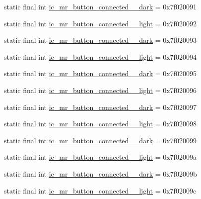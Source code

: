 \begin{CompactItemize}
static final int \hyperlink{classandroid_1_1support_1_1v7_1_1mediarouter_1_1_r_1_1drawable_a4b7ceed055ed8a8a606d55082029c1d}{ic\_\-mr\_\-button\_\-connected\_\_\-dark} = 0x7f020091
\item 
static final int \hyperlink{classandroid_1_1support_1_1v7_1_1mediarouter_1_1_r_1_1drawable_e6fe39132d78265ba9bde059a2617a70}{ic\_\-mr\_\-button\_\-connected\_\_\-light} = 0x7f020092
\item 
static final int \hyperlink{classandroid_1_1support_1_1v7_1_1mediarouter_1_1_r_1_1drawable_1183c77114c34077fe4e54994c1e7ea2}{ic\_\-mr\_\-button\_\-connected\_\_\-dark} = 0x7f020093
\item 
static final int \hyperlink{classandroid_1_1support_1_1v7_1_1mediarouter_1_1_r_1_1drawable_848f3fd8d2eba79fd1729a7da03676ee}{ic\_\-mr\_\-button\_\-connected\_\_\-light} = 0x7f020094
\item 
static final int \hyperlink{classandroid_1_1support_1_1v7_1_1mediarouter_1_1_r_1_1drawable_a94cb3138c5e424335cd6d3b458a693c}{ic\_\-mr\_\-button\_\-connected\_\_\-dark} = 0x7f020095
\item 
static final int \hyperlink{classandroid_1_1support_1_1v7_1_1mediarouter_1_1_r_1_1drawable_faa627654ae3a94f848380115d5cb4b5}{ic\_\-mr\_\-button\_\-connected\_\_\-light} = 0x7f020096
\item 
static final int \hyperlink{classandroid_1_1support_1_1v7_1_1mediarouter_1_1_r_1_1drawable_0e6b4a5eeeac52d13503385c0054c90e}{ic\_\-mr\_\-button\_\-connected\_\_\-dark} = 0x7f020097
\item 
static final int \hyperlink{classandroid_1_1support_1_1v7_1_1mediarouter_1_1_r_1_1drawable_79076d41d07c34caa45f762e806cdafb}{ic\_\-mr\_\-button\_\-connected\_\_\-light} = 0x7f020098
\item 
static final int \hyperlink{classandroid_1_1support_1_1v7_1_1mediarouter_1_1_r_1_1drawable_f205e6f4d2d6845e7c35691b739567ac}{ic\_\-mr\_\-button\_\-connected\_\_\-dark} = 0x7f020099
\item 
static final int \hyperlink{classandroid_1_1support_1_1v7_1_1mediarouter_1_1_r_1_1drawable_86fd229f6803591794353fbc3a47dc45}{ic\_\-mr\_\-button\_\-connected\_\_\-light} = 0x7f02009a
\item 
static final int \hyperlink{classandroid_1_1support_1_1v7_1_1mediarouter_1_1_r_1_1drawable_edc7717ef204ea4f8324f409ff533e52}{ic\_\-mr\_\-button\_\-connected\_\_\-dark} = 0x7f02009b
\item 
static final int \hyperlink{classandroid_1_1support_1_1v7_1_1mediarouter_1_1_r_1_1drawable_0d6f0d533c0c14f84432993322659453}{ic\_\-mr\_\-button\_\-connected\_\_\-light} = 0x7f02009c

\end{CompactItemize}
